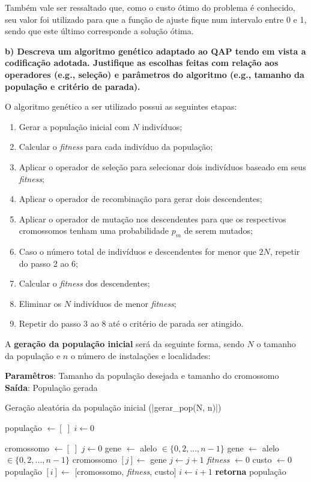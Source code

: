 \documentclass[a4paper, 12pt]{article}
\newenvironment{brprocess}[1][]
  {\begin{algorithm}[#1]
     \selectlanguage{brazilian}%
     \floatname{algorithm}{Processo}%
     \renewcommand{\algorithmicif}{\textbf{se}}%
     \renewcommand{\algorithmicfor}{\textbf{para}}%
     \renewcommand{\algorithmicdo}{\textbf{faça}}%
     \renewcommand{\algorithmicthen}{\textbf{faça}}%
     \renewcommand{\algorithmicend}{\textbf{fim}}%
     \renewcommand{\algorithmicwhile}{\textbf{enquanto}}%
     \renewcommand{\algorithmicelse}{\textbf{caso contrário}}%
  }
  {\end{algorithm}}
\begin{document}
Também vale ser ressaltado que, como o custo ótimo do problema é conhecido, seu valor foi utilizado para que a função de ajuste fique num intervalo entre 0 e 1, sendo que este último corresponde a solução ótima.

\textbf{b) Descreva um algoritmo genético adaptado ao QAP tendo em vista a codificação adotada. Justifique as escolhas feitas com relação aos operadores (e.g., seleção) e parâmetros do algoritmo (e.g., tamanho da população e critério de parada).}

O algoritmo genético a ser utilizado possui as seguintes etapas:
\begin{enumerate}
    \item Gerar a população inicial com $N$ indivíduos;
    \item Calcular o \textit{fitness} para cada indivíduo da população;
    \item Aplicar o operador de seleção para selecionar dois indivíduos baseado em seus \textit{fitness};
    \item Aplicar o operador de recombinação para gerar dois descendentes;
    \item Aplicar o operador de mutação nos descendentes para que os respectivos cromossomos tenham uma probabilidade $p_m$ de serem mutados;
    \item Caso o número total de indivíduos e descendentes for menor que $2N$, repetir do passo 2 ao 6;
    \item Calcular o \textit{fitness} dos descendentes;
    \item Eliminar os $N$ indivíduos de menor \textit{fitness};
    \item Repetir do passo 3 ao 8 até o critério de parada ser atingido.
\end{enumerate}

A \textbf{geração da população inicial} será da seguinte forma, sendo $N$ o tamanho da população e $n$ o número de instalações e localidades:
\begin{brprocess}[H]
\textbf{Paramêtros}: Tamanho da população desejada e tamanho do cromossomo\\
\textbf{Saída}: População gerada
\caption{Geração aleatória da população inicial (\Pverb|gerar_pop(N, n)|)}
\begin{algorithmic}
\State população $\gets [\;]$
\State $i\gets 0$

    \State cromossomo $\gets [\;]$
    \State $j \gets 0$
        \State gene $\gets$ alelo $\in \{0, 2, ..., n - 1\}$
            \State gene $\gets$ alelo $\in \{0, 2, ..., n - 1\}$
        \EndWhile
        \State cromossomo $[j] \gets$ gene
        \State $j \gets j + 1$
    \EndWhile
    \State \textit{fitness} $\gets 0$
    \State custo $\gets 0$
    \State população $[i] \gets$ [cromossomo, \textit{fitness}, custo]
    \State $i \gets i + 1$
\EndWhile
\State \textbf{retorna} população
\end{algorithmic}
\end{brprocess}
\end{document}
